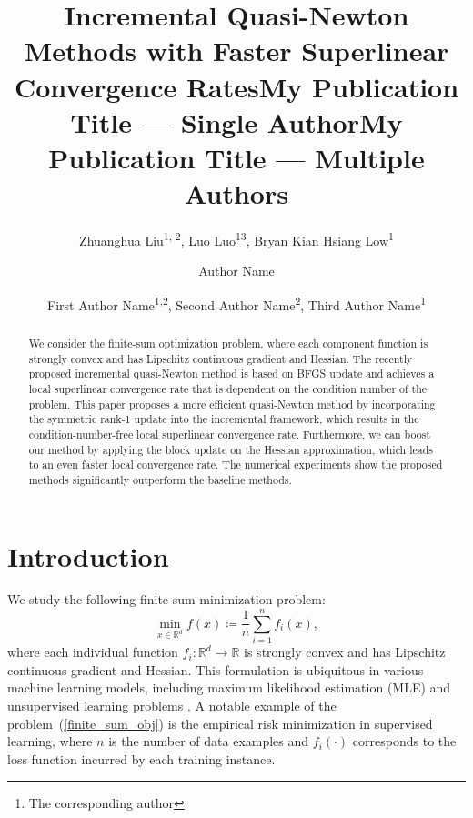 \documentclass[letterpaper]{article} %
\title{Incremental Quasi-Newton Methods with Faster Superlinear Convergence Rates}
\author{
    Zhuanghua Liu\textsuperscript{\rm 1, \rm2},
    Luo Luo\thanks{The corresponding author}\textsuperscript{\rm 3},
    Bryan Kian Hsiang Low\textsuperscript{\rm 1}
}
\title{My Publication Title --- Single Author}
\author {
    Author Name
}
\title{My Publication Title --- Multiple Authors}
\author {
    First Author Name\textsuperscript{\rm 1,\rm 2},
    Second Author Name\textsuperscript{\rm 2},
    Third Author Name\textsuperscript{\rm 1}
}
\theoremstyle{plain}
\theoremstyle{definition}
\theoremstyle{remark}
\DeclarePairedDelimiter\ceil{\lceil}{\rceil}
\def\BR{{\mathbb{R}}}
\def\fO{{\mathcal{O}}}
\begin{document}
\maketitle

\begin{abstract}
We consider the finite-sum optimization problem, where each component function is strongly convex and has Lipschitz continuous gradient and Hessian.
The recently proposed incremental quasi-Newton method is based on BFGS update and achieves a local superlinear convergence rate that is dependent on the condition number of the problem. 
This paper proposes a more efficient quasi-Newton method by incorporating the symmetric rank-1 update into the incremental framework, which results in the condition-number-free local superlinear convergence rate. 
Furthermore, we can boost our method by applying the block update on the Hessian approximation, which leads to an even faster local convergence rate. 
The numerical experiments show the proposed methods significantly outperform the baseline methods.
\end{abstract}

\section{Introduction}
We study the following finite-sum minimization problem:
\begin{equation}
    \min_{x\in\BR^d} f(x) \coloneqq \frac{1}{n} \sum_{i=1}^{n} f_i (x),
    \label{finite_sum_obj}
\end{equation}
where each individual function $f_i: \BR^d \to \BR$ is strongly convex and has Lipschitz continuous gradient and Hessian. 
This formulation is ubiquitous in various machine learning models, including maximum likelihood estimation (MLE) \cite{bishop2006pattern, bottou2018optimization} and unsupervised learning problems \cite{murphy2012machine, hastie2009elements}. 
A notable example of the problem~(\ref{finite_sum_obj}) is the empirical risk minimization in supervised learning, where $n$ is the number of data examples and $f_i(\cdot)$ corresponds to the loss function incurred by each training instance.
\end{document}
